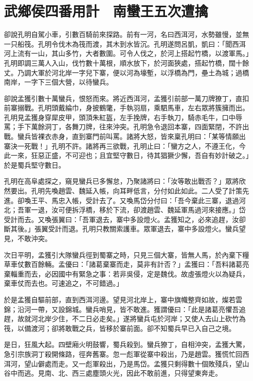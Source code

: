 
\chapter{武鄉侯四番用計　南蠻王五次遭擒}

卻說孔明自駕小車，引數百騎前來探路。前有一河，名曰西洱河，水勢雖慢，並無一只船筏。孔明令伐木為筏而渡，其木到水皆沉。孔明遂問呂凱，凱曰：「聞西洱河上流有一山，其山多竹，大者數圍。可令人伐之，於河上搭起竹橋，以渡軍馬。」孔明即調三萬人入山，伐竹數十萬根，順水放下，於河面狹處，搭起竹橋，闊十餘丈。乃調大軍於河北岸一字兒下寨，便以河為壕塹，以浮橋為門，壘土為城；過橋南岸，一字下三個大營，以待蠻兵。

卻說孟獲引數十萬蠻兵，恨怒而來。將近西洱河，孟獲引前部一萬刀牌獠丁，直扣前寨搦戰。孔明頭戴綸巾，身披鶴氅，手執羽扇，乘駟馬車，左右眾將簇擁而出。孔明見孟獲身穿犀皮甲，頭頂朱紅盔，左手挽牌，右手執刀，騎赤毛牛，口中辱罵；手下萬餘洞丁，各舞刀牌，往來沖突。孔明急令退回本寨，四面緊閉，不許出戰。蠻兵皆裸衣赤身，直到寨門前叫罵。諸將大怒，皆來稟孔明曰：「某等情願出寨決一死戰！」孔明不許。諸將再三欲戰，孔明止曰：「蠻方之人，不遵王化，今此一來，狂惡正盛，不可迎也；且宜堅守數日，待其猖獗少懈，吾自有妙計破之。」於是蜀兵堅守數日。

孔明在高阜處探之，窺見蠻兵已多懈怠，乃聚諸將曰：「汝等敢出戰否？」眾將欣然要出。孔明先喚趙雲、魏延入帳，向耳畔低言，分付如此如此。二人受了計策先進。卻喚王平、馬忠入帳，受計去了。又喚馬岱分付曰：「吾今棄此三寨，退過河北；吾軍一退，汝可便拆浮橋，移於下流，卻渡趙雲、魏延軍馬過河來接應。」岱受計而去。又喚張翼曰：「吾軍退去，寨中多設燈火。孟獲知之，必來追趕，汝卻斷其後。」張翼受計而退。孔明只教關索護車。眾軍退去，寨中多設燈火。蠻兵望見，不敢沖突。

次日平明，孟獲引大隊蠻兵徑到蜀寨之時，只見三個大寨，皆無人馬，於內棄下糧草車仗數百餘輛。孟優曰：「諸葛棄寨而走，莫非有計否？」孟獲曰：「吾料諸葛亮棄輜重而去，必因國中有緊急之事：若非吳侵，定是魏伐。故虛張燈火以為疑兵，棄車仗而去也。可速追之，不可錯過。」

於是孟獲自驅前部，直到西洱河邊。望見河北岸上，寨中旗幟整齊如故，燦若雲錦；沿河一帶，又設錦城。蠻兵哨見，皆不敢進。獲謂優曰：「此是諸葛亮懼吾追趕，故就河北岸少住，不二日必走矣。」遂將蠻兵屯於河岸；又使人去山上砍竹為筏，以備渡河；卻將敢戰之兵，皆移於寨前面。卻不知蜀兵早已入自己之境。

是日，狂風大起。四壁廂火明鼓響，蜀兵殺到。蠻兵獠丁，自相沖突，孟獲大驚，急引宗族洞丁殺開條路，徑奔舊寨。忽一彪軍從寨中殺出，乃是趙雲。獲慌忙回西洱河，望山僻處而走。又一彪軍殺出，乃是馬岱。孟獲只剩得數十個敗殘兵，望山谷中而逃。見南、北、西三處塵頭火光，因此不敢前進，只得望東奔走。

